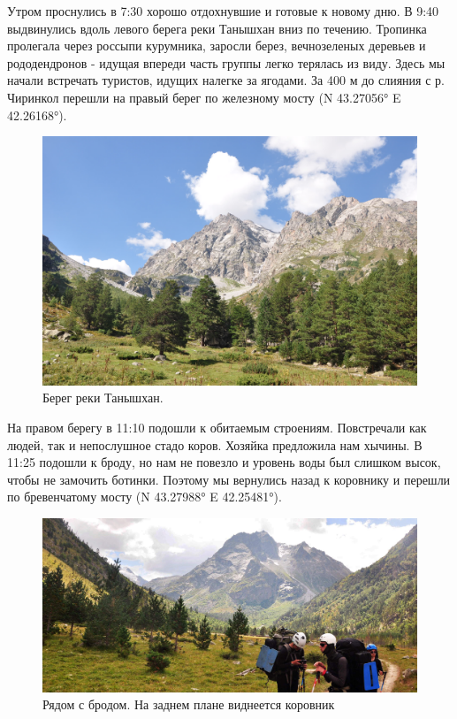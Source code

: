 Утром проснулись в 7:30 хорошо отдохнувшие и готовые к новому дню. В 9:40 выдвинулись вдоль левого берега реки Танышхан вниз по течению. Тропинка пролегала через россыпи курумника, заросли берез, вечнозеленых деревьев  и рододендронов - идущая впереди часть группы легко терялась из виду. Здесь мы начали встречать туристов, идущих налегке за ягодами. За 400 м до слияния с р. Чиринкол перешли на правый берег по железному мосту (N 43.27056° E 42.26168°). 
\begin{figure}[h!]
	\centering
	\includegraphics[width=0.7\linewidth]{../pics/DSC_0459 2}
	\caption{Берег реки Танышхан.}
	\label{fig:DSC_0459}
\end{figure}
На правом берегу в 11:10 подошли к обитаемым строениям. Повстречали как людей, так и непослушное стадо коров. Хозяйка предложила нам хычины. В 11:25 подошли к броду, но нам не повезло и уровень воды был слишком высок, чтобы не замочить ботинки. Поэтому мы вернулись назад к коровнику и перешли по бревенчатому мосту (N 43.27988° E 42.25481°).
\begin{figure}[h!]
	\centering
	\includegraphics[width=0.7\linewidth]{../pics/DSC_0462 2}
	\caption{Рядом с бродом. На заднем плане виднеется коровник}
	\label{fig:DSC_0462}
\end{figure}


